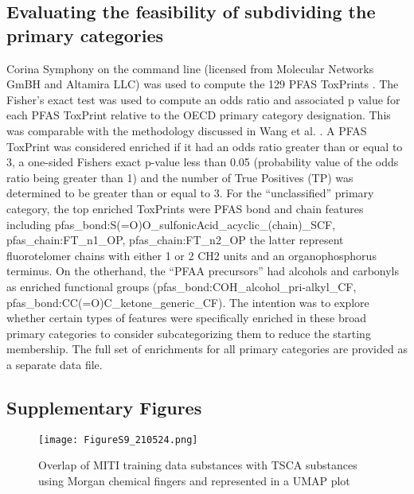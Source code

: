 \documentclass[
  super,
  preprint,
  3p]{elsarticle}
\begin{document}
\hypertarget{sec-supp}{%
\subsection{Evaluating the feasibility of subdividing the primary
categories}\label{sec-supp}}

Corina Symphony on the command line (licensed from Molecular Networks
GmBH and Altamira LLC) was used to compute the 129 PFAS ToxPrints
\citep{richard_new_2023}. The Fisher's exact test was used to compute an
odds ratio and associated p value for each PFAS ToxPrint relative to the
OECD primary category designation. This was comparable with the
methodology discussed in Wang et al. \citep{wang_high-throughput_2019}.
A PFAS ToxPrint was considered enriched if it had an odds ratio greater
than or equal to 3, a one-sided Fishers exact p-value less than 0.05
(probability value of the odds ratio being greater than 1) and the
number of True Positives (TP) was determined to be greater than or equal
to 3. For the ``unclassified'' primary category, the top enriched
ToxPrints were PFAS bond and chain features including
pfas\_bond:S(=O)O\_sulfonicAcid\_acyclic\_(chain)\_SCF,
pfas\_chain:FT\_n1\_OP, pfas\_chain:FT\_n2\_OP the latter represent
fluorotelomer chains with either 1 or 2 CH2 units and an
organophosphorus terminus. On the otherhand, the ``PFAA precursors'' had
alcohols and carbonyls as enriched functional groups
(pfas\_bond:COH\_alcohol\_pri-alkyl\_CF,
pfas\_bond:CC(=O)C\_ketone\_generic\_CF). The intention was to explore
whether certain types of features were specifically enriched in these
broad primary categories to consider subcategorizing them to reduce the
starting membership. The full set of enrichments for all primary
categories are provided as a separate data file. \newpage{}

\hypertarget{supplementary-figures}{%
\subsection*{Supplementary Figures}\label{supplementary-figures}}

\begin{figure}

{\centering \texttt{[image: FigureS9\_210524.png]}

}

\caption{\label{fig-miti}Overlap of MITI training data substances with
TSCA substances using Morgan chemical fingers and represented in a UMAP
plot}

\end{figure}
\end{document}
